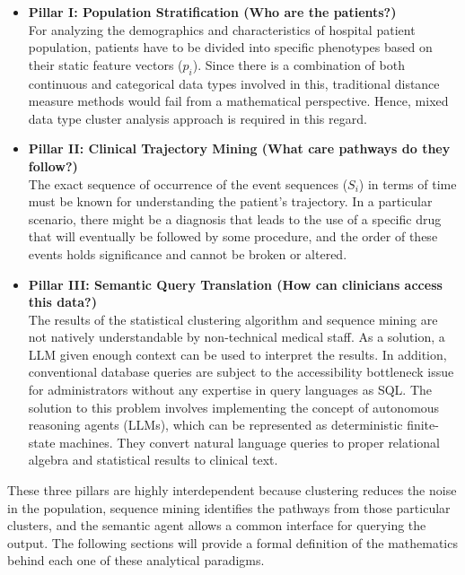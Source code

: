 \begin{itemize}
    \item \textbf{Pillar I: Population Stratification (Who are the patients?)} \\
    For analyzing the demographics and characteristics of hospital patient population, patients have to be divided into specific phenotypes based on their static feature vectors ($p_i$). Since there is a combination of both continuous and categorical data types involved in this, traditional distance measure methods would fail from a mathematical perspective. Hence, mixed data type cluster analysis approach is required in this regard.

    \vspace{0.5em}

    \item \textbf{Pillar II: Clinical Trajectory Mining (What care pathways do they follow?)} \\
    The exact sequence of occurrence of the event sequences ($S_i$) in terms of time must be known for understanding the patient's trajectory. In a particular scenario, there might be a diagnosis that leads to the use of a specific drug that will eventually be followed by some procedure, and the order of these events holds significance and cannot be broken or altered.

    \vspace{0.5em}

    \item \textbf{Pillar III: Semantic Query Translation (How can clinicians access this data?)} \\
    The results of the statistical clustering algorithm and sequence mining are not natively understandable by non-technical medical staff. As a solution, a LLM given enough context can be used to interpret the results. In addition, conventional database queries are subject to the accessibility bottleneck issue for administrators without any expertise in query languages as SQL. The solution to this problem involves implementing the concept of autonomous reasoning agents (LLMs), which can be represented as deterministic finite-state machines. They convert natural language queries to proper relational algebra and statistical results to clinical text.
\end{itemize}

\vspace{1em}

These three pillars are highly interdependent because clustering reduces the noise in the population, sequence mining identifies the pathways from those particular clusters, and the semantic agent allows a common interface for querying the output. The following sections will provide a formal definition of the mathematics behind each one of these analytical paradigms.

